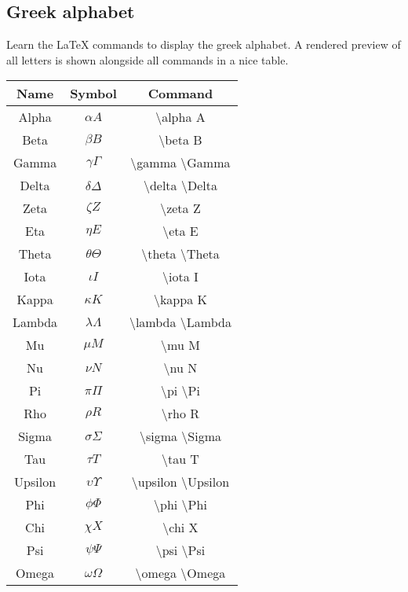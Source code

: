   \subsection{Greek alphabet}
  Learn the LaTeX commands to display the greek alphabet. A rendered preview of all letters is shown alongside all commands in a nice table.
  \begin{center}
  \begin{tabular}{ccc}
  \toprule  %
  Name&	Symbol&	Command\\
  \midrule  %
  Alpha	 & $\alpha A$ & \textbackslash alpha A \\
  Beta	 & $\beta B$ & \textbackslash beta B \\
  Gamma	 & $\gamma \Gamma $ & \textbackslash gamma \textbackslash Gamma\\
  Delta	 & $\delta  \Delta $ & \textbackslash delta  \textbackslash Delta\\
  Zeta	 & $\zeta  Z$ & \textbackslash zeta  Z \\
  Eta	 & $\eta E$ & \textbackslash eta E \\
  Theta	 & $\theta \Theta$ & \textbackslash theta \textbackslash Theta \\
  Iota	 & $\iota I$ & \textbackslash iota I \\
  Kappa	 & $\kappa K$ & \textbackslash kappa K \\
  Lambda	 & $\lambda \Lambda$ & \textbackslash lambda \textbackslash Lambda \\
  Mu	 & $\mu M$ & \textbackslash mu M \\
  Nu	 & $\nu N$ & \textbackslash nu N \\
  Pi	 & $\pi \Pi$ & \textbackslash pi \textbackslash Pi \\
  Rho	 & $\rho R$ & \textbackslash rho R \\
  Sigma	 & $\sigma \Sigma$ & \textbackslash sigma \textbackslash Sigma \\
  Tau	 & $\tau T$ & \textbackslash tau T \\
  Upsilon	 & $\upsilon \Upsilon$ & \textbackslash upsilon \textbackslash Upsilon \\
  Phi	 & $\phi \Phi$ & \textbackslash phi \textbackslash Phi\\
  Chi	 & $\chi X$ & \textbackslash chi X \\
  Psi	 & $\psi \Psi$ & \textbackslash psi \textbackslash Psi \\
  Omega	 & $\omega \Omega$ & \textbackslash omega \textbackslash Omega \\
  \bottomrule %
  \end{tabular}
  \end{center}

